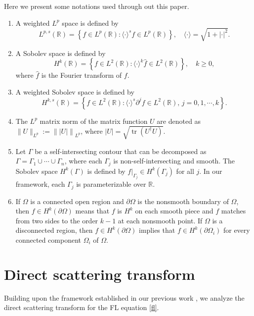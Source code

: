 \documentclass[preprint,compress,12pt]{elsarticle}
\numberwithin{equation}{section}
\begin{document}
Here we present some notations used through out this paper.
\begin{enumerate}[label=(\arabic*)]
  \item  A weighted $L^{p}$ space is defined by
         \begin{equation*}
         L^{p,s}(\mathbb{R})=\left\{f\in L^{p}(\mathbb{R}): \langle \cdot\rangle^{s}f\in L^{p}(\mathbb{R})\right\}, \quad \langle \cdot\rangle=\sqrt{1+|\cdot|^{2}}.
         \end{equation*}
  \item A Sobolev space is defined by
         \begin{equation*}
         H^{k}(\mathbb{R})=\left\{f\in L^{2}(\mathbb{R}): \langle \cdot\rangle^{k}\widehat{f}\in L^{2}(\mathbb{R})\right\},\quad k\geq0,
         \end{equation*}
         where $\widehat{f}$ is the Fourier transform of $f$.
  \item A weighted Sobolev space is defined by
         \begin{equation*}
         H^{k,s}(\mathbb{R})=\left\{f\in L^{2}(\mathbb{R}): \langle \cdot\rangle^{s}\partial^{j}f\in L^{2}(\mathbb{R}), \, j=0,1,\cdots,k\right\}.
         \end{equation*}
  \item  The $L^{p}$ matrix norm of the matrix function $U$ are denoted as $\|U\|_{L^{p}}:=\left\| \left|U\right| \right\|_{L^{p}}$, where $|U|=\sqrt{\operatorname{tr}(U^{\dag}U)}$.
  \item Let $\Gamma$ be a self-intersecting contour that can be decomposed as $\Gamma=\Gamma_{1}\cup\cdots\cup\Gamma_{n}$, where each $\Gamma_{j}$ is non-self-intersecting and smooth. The Sobolev space $H^{k}(\Gamma)$ is defined by $f|_{\Gamma_{j}}\in H^{k}(\Gamma_{j})$ for all $j$. In our framework, each $\Gamma_{j}$ is parameterizable over $\mathbb{R}$.
  \item If $\Omega$ is a connected open region and $\partial\Omega$ is the nonsmooth boundary of $\Omega$, then $f\in H^{k}(\partial\Omega)$ means that $f$ is $ H^{k}$ on each smooth piece and $f$ matches from two sides to the order $k-1$ at each nonsmooth point. If $\Omega$ is a disconnected region, then $f\in H^{k}(\partial\Omega)$ implies that $f\in H^{k}(\partial\Omega_{i})$ for every connected component $\Omega_{i}$ of $\Omega$.

\end{enumerate}

\section{Direct scattering transform}\label{sec2}
Building upon the framework established in our previous work \cite{Chengglo}, we analyze the direct scattering transform for the FL equation \eqref{fl}.
\end{document}
